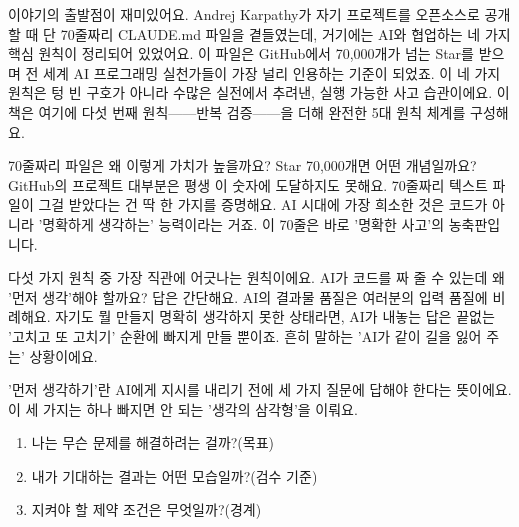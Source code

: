 

이야기의 출발점이 재미있어요. Andrej Karpathy가 자기 프로젝트를 오픈소스로 공개할 때 단 70줄짜리 CLAUDE.md 파일을 곁들였는데, 거기에는 AI와 협업하는 네 가지 핵심 원칙이 정리되어 있었어요. 이 파일은 GitHub에서 70,000개가 넘는 Star를 받으며 전 세계 AI 프로그래밍 실천가들이 가장 널리 인용하는 기준이 되었죠. 이 네 가지 원칙은 텅 빈 구호가 아니라 수많은 실전에서 추려낸, 실행 가능한 사고 습관이에요. 이 책은 여기에 다섯 번째 원칙——반복 검증——을 더해 완전한 5대 원칙 체계를 구성해요.

\begin{tcbinfo}{70줄짜리 파일은 왜 이렇게 가치가 높을까요?}
Star 70,000개면 어떤 개념일까요? GitHub의 프로젝트 대부분은 평생 이 숫자에 도달하지도 못해요. 70줄짜리 텍스트 파일이 그걸 받았다는 건 딱 한 가지를 증명해요. AI 시대에 가장 희소한 것은 코드가 아니라 '명확하게 생각하는' 능력이라는 거죠. 이 70줄은 바로 '명확한 사고'의 농축판입니다.

\end{tcbinfo}


다섯 가지 원칙 중 가장 직관에 어긋나는 원칙이에요. AI가 코드를 짜 줄 수 있는데 왜 '먼저 생각'해야 할까요? 답은 간단해요. AI의 결과물 품질은 여러분의 입력 품질에 비례해요. 자기도 뭘 만들지 명확히 생각하지 못한 상태라면, AI가 내놓는 답은 끝없는 '고치고 또 고치기' 순환에 빠지게 만들 뿐이죠. 흔히 말하는 'AI가 같이 길을 잃어 주는' 상황이에요.

'먼저 생각하기'란 AI에게 지시를 내리기 전에 세 가지 질문에 답해야 한다는 뜻이에요. 이 세 가지는 하나 빠지면 안 되는 '생각의 삼각형'을 이뤄요.

\begin{enumerate}
  \item 나는 무슨 문제를 해결하려는 걸까?(목표)
  \item 내가 기대하는 결과는 어떤 모습일까?(검수 기준)
  \item 지켜야 할 제약 조건은 무엇일까?(경계)
\end{enumerate}

